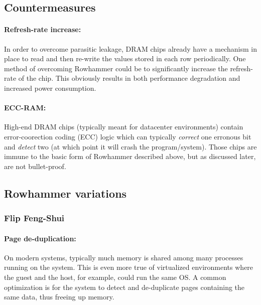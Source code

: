 \subsection{Countermeasures}
\paragraph{Refresh-rate increase:} In order to overcome parasitic leakage, DRAM chips already have a mechanism in place to read and then re-write the values stored in each row periodically. One method of overcoming Rowhammer could be to significantly increase the refresh-rate of the chip. This obviously results in both performance degradation and increased power consumption.

\paragraph{ECC-RAM:} High-end DRAM chips (typically meant for datacenter environments) contain error-coorection coding (ECC) logic which can typically \emph{correct} one erronous bit and \emph{detect} two (at which point it will crash the program/system). Those chips are immune to the basic form of Rowhammer described above, but as discussed later, are not bullet-proof.

\subsection{Rowhammer variations}
\subsubsection{Flip Feng-Shui}
\paragraph{Page de-duplication:} On modern systems, typically much memory is shared among many processes running on the system. This is even more true of virtualized environments where the guest and the host, for example, could run the same OS. A common optimization is for the system to detect and de-duplicate pages containing the same data, thus freeing up memory.
